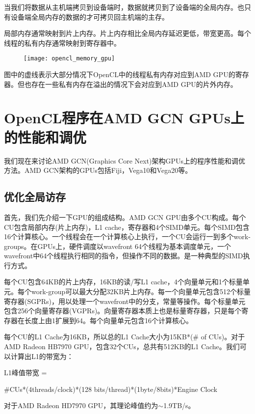 当我们将数据从主机端拷贝到设备端时，数据就拷贝到了设备端的全局内存。也只有设备端全局内存的数据的才可拷贝回主机端的主存。

局部内存通常映射到片上内存。片上内存相比全局内存延迟更低，带宽更高。每个线程的私有内存通常映射到寄存器中。

\begin{figure}[htbp]
	\centering
	\texttt{[image: opencl\_memory\_gpu]}
	\label{fig:opencl_memory_gpu}
\end{figure}

图中的虚线表示大部分情况下OpenCL中的线程私有内存对应到AMD GPU的寄存器。但也存在一些私有内存在溢出的情况下会对应到AMD GPU的片外内存。


\section{OpenCL程序在AMD GCN GPUs上的性能和调优}
我们现在来讨论AMD GCN(Graphics Core Next)架构GPUs上的程序性能和调优方法。AMD GCN架构的GPUs包括Fiji，Vega10和Vega20等。

\subsection{优化全局访存}
首先，我们先介绍一下GPU的组成结构。AMD GCN GPU由多个CU构成。每个CU包含局部内存(片上内存)，L1 cache，寄存器和4个SIMD单元。每个SIMD包含16个计算核心。一个线程会在一个计算核心上执行，一个CU会运行一到多个work-groups。在GPUs上，硬件调度以wavefront 64个线程为基本调度单元，一个wavefront中64个线程执行相同的指令，但操作不同的数据。是一种典型的SIMD执行方式。

每个CU包含64KB的片上内存，16KB的读/写L1 cache，4个向量单元和1个标量单元。每个work-group可以最大分配32KB片上内存。每一个向量单元包含512个标量寄存器(SGPRs)，用以处理一个wavefront中的分支，常量等操作。每个标量单元包含256个向量寄存器(VGPRs)。向量寄存器本质上也是标量寄存器，只是每个寄存器在长度上由1扩展到64。每个向量单元包含16个计算核心。

每个CU的L1 Cache为16KB，所以总的L1 Cache大小为15KB*(\# of CUs)。对于AMD Radeon HB7970 GPU，包含32个CUs，总共有512KB的L1 Cache。我们可以计算出L1的带宽为：

L1峰值带宽 = 

\#CUs*(4threads/clock)*(128 bits/thread)*(1byte/8bits)*Engine Clock

对于AMD Radeon HD7970 GPU，其理论峰值约为$\sim$1.9TB/s。

